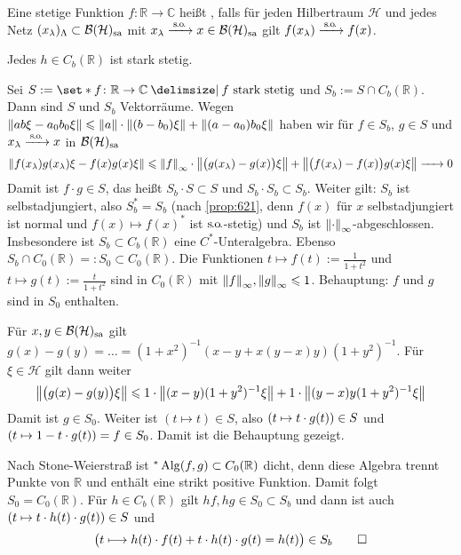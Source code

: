\begin{definition}[label=def:622,{name=[{stark stetige Funktion}]}]
	Eine stetige Funktion $f \colon \mathbb{R} \to \mathbb{C}$ heißt , falls für jeden Hilbertraum $\mathcal{H}$ und jedes Netz $(x_\lambda)_\Lambda \subset \mathcal{B}(\mathcal{H})_\sa$ mit $x_\lambda \grenzw{\so} x \in \mathcal{B}(\mathcal{H})_\sa$ gilt $f(x_\lambda) \grenzw{\so}f(x)$.
\end{definition}

\begin{proposition}[label=prop:623]
	Jedes $h \in C_b(\mathbb{R})$ ist stark stetig.
\end{proposition}
\begin{beweis}
	Sei $S := \set*{f \colon \mathbb{R}\to \mathbb{C} \given f \text{ stark stetig}}$ und $S_b := S \cap C_b(\mathbb{R})$.
	Dann sind $S$ und $S_b$ Vektorräume. 
	Wegen $\norm*{ab \xi - a_0 b_0 \xi} \le \norm*{a} \cdot \norm*{(b-b_0)\xi} + \norm*{(a-a_0)b_0\xi}$ haben wir für $f \in S_b$, $g \in S$ und $x_\lambda \grenzw{\so}x$ in $\mathcal{B}(\mathcal{H})_\sa$
	\[
		\norm*{f(x_\lambda) g(x_\lambda) \xi - f(x) g(x)\xi} \le \norm*{f}_\infty \cdot \norm*{\enbrace[\big]{g(x_\lambda)- g(x)}\xi} + \norm*{ \enbrace[\big]{f(x_\lambda)- f(x)} g(x) \xi}
		\grenzw{} 0
	\]
	Damit ist $f \cdot g \in S$, das heißt $S_b \cdot S \subset S$ und $S_b \cdot S_b \subset S_b$.
	Weiter gilt: $S_b$ ist selbstadjungiert, also $S_b^*=S_b$ (nach \autoref{prop:621}, denn $f(x)$ für $x$ selbstadjungiert ist normal und $f(x) \mapsto f(x)^*$ ist $\so$-stetig) und $S_b$ ist $\norm*{\cdot}_\infty$-abgeschlossen.
	Insbesondere ist $S_b \subset C_b(\mathbb{R})$ eine $C^*$-Unteralgebra.
	Ebenso $S_b \cap C_0(\mathbb{R}) =: S_0 \subset C_0(\mathbb{R})$.
	Die Funktionen $t \mapsto f(t):= \frac{1}{1+t^2}$ und $t \mapsto g(t) := \frac{t}{1+t^2}$ sind in $C_0(\mathbb{R})$ mit $\norm*{f}_\infty, \norm*{g}_\infty\le 1$.
	Behauptung: $f$ und $g$ sind in $S_0$ enthalten.
	
	Für $x,y \in \mathcal{B}(\mathcal{H})_\sa$ gilt $g(x)-g(y)= \ldots = (1+x^2)^{-1}(x-y+x(y-x)y)(1+y^2)^{-1}$. 
	Für $\xi \in \mathcal{H}$ gilt dann weiter 
	\[
		\norm*{\enbrace[\big]{g(x)-g(y)}\xi} \le 1 \cdot \norm*{(x-y)(1+y^2)^{-1} \xi} + 1 \cdot \norm*{(y-x) y(1+y^2)^{-1} \xi}
	\]
	Damit ist $g \in S_0$.
	Weiter ist $(t \mapsto t) \in S$, also $\enbrace*{t \mapsto t \cdot g(t)} \in S$ und $\enbrace*{t \mapsto 1-t \cdot g(t)}=f \in S_0$. 
	Damit ist die Behauptung gezeigt.
	
	Nach Stone-Weierstraß ist $^*\Alg(f,g) \subset C_0(\mathbb{R})$ dicht, denn diese Algebra trennt Punkte von $\mathbb{R}$ und enthält eine strikt positive Funktion.
	Damit folgt $S_0=C_0(\mathbb{R})$.
	Für $h \in C_b(\mathbb{R})$ gilt $hf, hg \in S_0 \subset S_b$ und dann ist auch $\enbrace*{t \mapsto t \cdot h(t) \cdot g(t)} \in S$ und
	\[
		\enbrace[\big]{t \longmapsto h(t) \cdot f(t) + t \cdot h(t) \cdot g(t)=h(t)} \in S_b \qedhere
	\]
\end{beweis}

